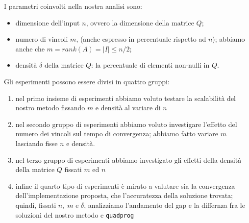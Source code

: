 I parametri coinvolti nella nostra analisi sono:
\begin{itemize}
    \item dimensione dell'input $n$, ovvero la dimensione della matrice $Q$;
    \item numero di vincoli $m$, (anche espresso in percentuale rispetto ad $n$); abbiamo anche che $m = rank(A) = |I| \leq n/2$;
    \item densità $\delta$ della matrice $Q$: la percentuale di elementi non-nulli in $Q$.
\end{itemize}
\newpage
Gli esperimenti possono essere divisi in quattro gruppi:
\begin{enumerate}
    \item nel primo insieme di esperimenti abbiamo voluto testare la scalabilità del nostro metodo fissando $m$ e densità al variare di $n$
    \item nel secondo gruppo di esperimenti abbiamo voluto investigare l'effetto del numero dei vincoli sul tempo di convergenza; abbiamo fatto variare $m$ lasciando fisse $n$ e densità.
    \item nel terzo gruppo di esperimenti abbiamo investigato gli effetti della densità della matrice $Q$ fissati $m$ ed $n$
    \item infine il quarto tipo di esperimenti è mirato a valutare sia la convergenza dell'implementazione proposta, che l'accuratezza della soluzione trovata; quindi, fissati $n, \; m$ e $\delta$, analizziamo l'andamento del gap e la differnza fra le soluzioni del nostro metodo e \texttt{quadprog}
\end{enumerate}

